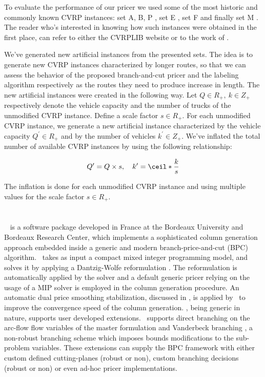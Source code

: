 \medskip

To evaluate the performance of our pricer we used some of the most historic
and commonly known
CVRP instances:
set A, B, P \parencite{augerat1995}, set E \parencite{christofides1969},
set F \parencite{fisher1994}
and finally set M \parencite{christofides1979}.
The reader who's interested in knowing how such instances were obtained in the first
place, can refer to either the CVRPLIB website or to the work of \textcite{uchoa2017}.

\medskip
{}

\medskip

We've generated new artificial instances from the presented sets.
The idea is to generate new CVRP instances characterized by longer routes,
so that we can assess the behavior of the proposed branch-and-cut pricer
and the labeling algorithm respectively as the routes
they need to produce increase in length.
The new artificial instances were created in the following way.
Let $Q \in R_+,\ k \in Z_+$ respectively denote the vehicle
capacity and the number of trucks of the unmodified CVRP instance.
Define a scale factor $s \in R_+$.
For each unmodified CVRP instance, we generate a new artificial instance
characterized by the vehicle capacity $Q^\prime \in R_+$
and by the number of vehicles $k^\prime \in Z_+$.
We've inflated the total number of available CVRP instances
by using the following relationship:

$$
	Q^\prime = Q \times s, \quad k^\prime = \ceil*{\frac{k}{s}}
$$

The inflation is done for each unmodified CVRP instance and using
multiple values for the scale factor $s \in R_+$.

\section{\bapcod}
\label{sec:results-bapcod}

\textit{\bapcod}\ \parencite{sadykov2021} is a software package
developed in France at the Bordeaux University and Bordeaux Research Center,
which implements a sophisticated column generation approach
embedded inside a generic and modern branch-price-and-cut (BPC) algorithm.
\bapcod\ takes as input a compact mixed integer programming model,
and solves it by applying a Dantzig-Wolfe reformulation \parencite{dantzig1960}.
The reformulation is automatically applied by the solver
and a default generic pricer relying on
the usage of a MIP solver is employed in the column generation procedure.
An automatic dual price smoothing stabilization, discussed in \textcite{pessoa2018automation},
is applied by \bapcod\ to improve the convergence speed of the column generation.
\bapcod, being generic in nature,
supports user developed extensions.
\bapcod\ supports direct branching on the arc-flow flow variables of the master formulation
and Vanderbeck branching \parencite{vanderbeck2011}, a non-robust branching
scheme which imposes bounds modifications to the sub-problem variables.
These extensions can supply the BPC framework with either
custom defined cutting-planes (robust or non), custom branching decisions (robust or non)
or even ad-hoc pricer implementations.

